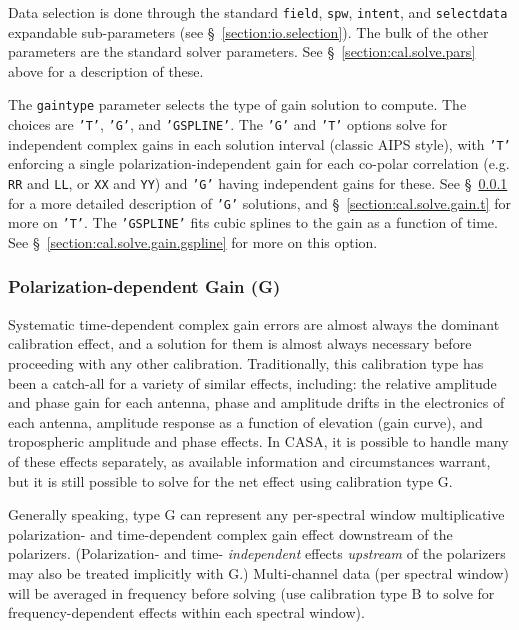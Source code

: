 \normalsize
Data selection is done through the standard {\tt field}, {\tt spw},
{\tt intent}, and 
{\tt selectdata} expandable sub-parameters (see \S~\ref{section:io.selection}).
The bulk of the other parameters are the standard solver parameters.  See
\S~\ref{section:cal.solve.pars} above for a description of these.

The {\tt gaintype} parameter selects the type of gain solution to
compute.  The choices are {\tt 'T'}, {\tt 'G'}, and {\tt 'GSPLINE'}.
The {\tt 'G'} and {\tt 'T'} options solve for independent complex
gains in each solution interval (classic AIPS style), with {\tt 'T'} 
enforcing a single polarization-independent gain for each co-polar
correlation (e.g. {\tt RR} and {\tt LL}, or {\tt XX} and {\tt YY})
and {\tt 'G'} having independent gains for these.  
See \S~\ref{section:cal.solve.gain.g} for a more detailed description
of {\tt 'G'} solutions, and \S~\ref{section:cal.solve.gain.t} for more
on {\tt 'T'}.  The {\tt 'GSPLINE'} fits cubic splines to the gain as
a function of time.  See \S~\ref{section:cal.solve.gain.gspline} for
more on this option.

\subsubsection{Polarization-dependent Gain (G)}
\label{section:cal.solve.gain.g}

Systematic time-dependent complex gain errors are almost always the
dominant calibration effect, and a solution for them is almost always
necessary before proceeding with any other calibration.
Traditionally, this calibration type has been a catch-all for a
variety of similar effects, including: the relative amplitude and
phase gain for each antenna, phase and amplitude drifts in the
electronics of each antenna, amplitude response as a function of
elevation (gain curve), and tropospheric amplitude and phase effects.
In CASA, it is possible to handle many of these effects separately, as
available information and circumstances warrant, but it is still
possible to solve for the net effect using calibration type G.

Generally speaking, type G can represent any per-spectral window
multiplicative polarization- and time-dependent complex gain effect
downstream of the polarizers.  (Polarization- and time- {\it independent} effects
{\it upstream} of the polarizers may also be treated implicitly with G.)
Multi-channel data (per spectral window) will be averaged in frequency
before solving (use calibration type B to solve for
frequency-dependent effects within each spectral window).

